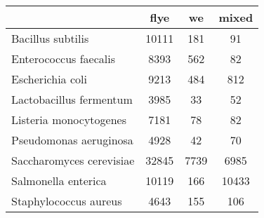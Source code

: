 \begin{minipage}{0.91\textwidth}
\begin{adjustbox}{center}
\begin{tabular}{|l||c|c|c|}
\hline
 & flye & we & mixed \\
\hline
\hline
Bacillus subtilis & \cellcolor[RGB]{235, 71, 71} 10111 & \cellcolor[RGB]{237, 237, 253} 181 & \cellcolor[RGB]{232, 232, 252} 91 \\
\hline
Enterococcus faecalis & \cellcolor[RGB]{235, 71, 71} 8393 & \cellcolor[RGB]{252, 232, 232} 562 & \cellcolor[RGB]{232, 232, 252} 82 \\
\hline
Escherichia coli & \cellcolor[RGB]{235, 71, 71} 9213 & \cellcolor[RGB]{223, 223, 251} 484 & \cellcolor[RGB]{246, 246, 254} 812 \\
\hline
Lactobacillus fermentum & \cellcolor[RGB]{235, 71, 71} 3985 & \cellcolor[RGB]{218, 218, 251} 33 & \cellcolor[RGB]{255, 255, 255} 52 \\
\hline
Listeria monocytogenes & \cellcolor[RGB]{235, 71, 71} 7181 & \cellcolor[RGB]{218, 218, 251} 78 & \cellcolor[RGB]{255, 255, 255} 82 \\
\hline
Pseudomonas aeruginosa & \cellcolor[RGB]{235, 71, 71} 4928 & \cellcolor[RGB]{218, 218, 251} 42 & \cellcolor[RGB]{255, 255, 255} 70 \\
\hline
Saccharomyces cerevisiae & \cellcolor[RGB]{235, 71, 71} 32845 & \cellcolor[RGB]{252, 232, 232} 7739 & \cellcolor[RGB]{232, 232, 252} 6985 \\
\hline
Salmonella enterica & \cellcolor[RGB]{255, 255, 255} 10119 & \cellcolor[RGB]{218, 218, 251} 166 & \cellcolor[RGB]{255, 255, 255} 10433 \\
\hline
Staphylococcus aureus & \cellcolor[RGB]{235, 71, 71} 4643 & \cellcolor[RGB]{252, 232, 232} 155 & \cellcolor[RGB]{232, 232, 252} 106 \\
\hline
\end{tabular}
\end{adjustbox}
\end{minipage}
